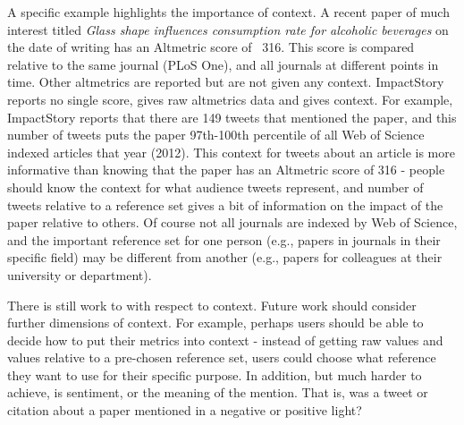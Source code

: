 \documentclass[letterpaper,superscriptaddress,showkeys,longbibliography]{revtex4-1}\usepackage{graphicx, color}
\begin{document}
A specific example highlights the importance of context. A recent paper of much interest titled \emph{Glass shape influences consumption rate for alcoholic beverages} \cite{attwood2012} on the date of writing has an Altmetric score of ~316. This score is compared relative to the same journal (PLoS One), and all journals at different points in time. Other altmetrics are reported but are not given any context. ImpactStory reports no single score, gives raw altmetrics data and gives context. For example, ImpactStory reports that there are 149 tweets that mentioned the paper, and this number of tweets puts the paper 97th-100th percentile of all Web of Science indexed articles that year (2012). This context for tweets about an article is more informative than knowing that the paper has an Altmetric score of 316 - people should know the context for what audience tweets represent, and number of tweets relative to a reference set gives a bit of information on the impact of the paper relative to others. Of course not all journals are indexed by Web of Science, and the important reference set for one person (e.g., papers in journals in their specific field) may be different from another (e.g., papers for colleagues at their university or department). 

There is still work to with respect to context. Future work should consider further dimensions of context. For example, perhaps users should be able to decide how to put their metrics into context - instead of getting raw values and values relative to a pre-chosen reference set, users could choose what reference they want to use for their specific purpose. In addition, but much harder to achieve, is sentiment, or the meaning of the mention. That is, was a tweet or citation about a paper mentioned in a negative or positive light?


\end{document}
